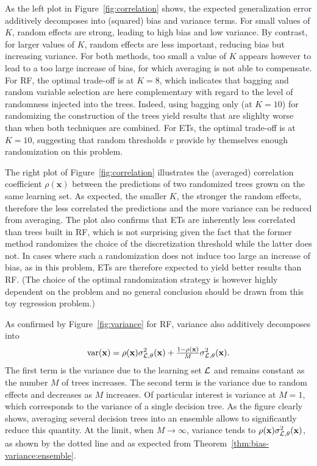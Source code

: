 As the left plot in Figure~\ref{fig:correlation} shows,  the expected
generalization error additively decomposes into (squared) bias and variance
terms.  For small values of $K$, random effects are strong, leading to high
bias and low variance. By contrast, for larger values of $K$, random effects
are less important, reducing bias but increasing variance.   For both methods,
too small a value of $K$ appears however to lead to a too large increase of
bias, for which averaging is not able to compensate. For RF, the optimal
trade-off is at $K=8$, which indicates that bagging and random variable selection are
here complementary with regard to the level of randomness injected into the
trees. Indeed, using bagging only (at $K=10$) for randomizing the construction
of the trees yield results that are slighlty worse than when both techniques
are combined. For ETs, the optimal trade-off is at $K=10$, suggesting that
random thresholds $v$ provide by themselves enough randomization on this
problem.

The right plot of Figure~\ref{fig:correlation} illustrates the (averaged)
correlation coefficient $\rho(\mathbf{x})$ between the predictions of two
randomized trees grown on the same learning set. As expected, the smaller $K$,
the stronger the random effects, therefore the less correlated the predictions
and the more variance can be reduced from averaging. The plot also confirms
that ETs are inherently less correlated than trees built
in RF, which is not surprising given the fact that the former
method randomizes the choice of the discretization threshold while the latter
does not. In cases where such a randomization does not induce too large an
increase of bias, as in this problem, ETs are therefore
expected to yield better results than RF.  (The choice of the
optimal randomization strategy is however highly dependent on the problem and
no general conclusion should be drawn from this toy regression problem.)

As confirmed by Figure~\ref{fig:variance} for RF, variance also additively decomposes  into
\begin{equation}
\text{var}(\mathbf{x}) = \rho(\mathbf{x}) \sigma^2_{{\cal L},\theta}(\mathbf{x}) + \tfrac{1 - \rho(\mathbf{x})}{M} \sigma^2_{{\cal L},\theta}(\mathbf{x}).
\end{equation}
The first term is the variance due to the learning set ${\cal L}$ and remains
constant as the number $M$ of trees increases. The second term is the variance
due to random effects and decreases as $M$ increases. Of particular interest is
variance at $M=1$, which corresponds to the variance of a single decision tree.
As the figure clearly shows, averaging several decision trees into an ensemble
allows to significantly reduce this quantity. At the limit, when $M\to \infty$,
variance tends to $\rho(\mathbf{x}) \sigma^2_{{\cal L},\theta}(\mathbf{x})$, as shown by
the dotted line and as expected from Theorem~\ref{thm:bias-variance:ensemble}.

